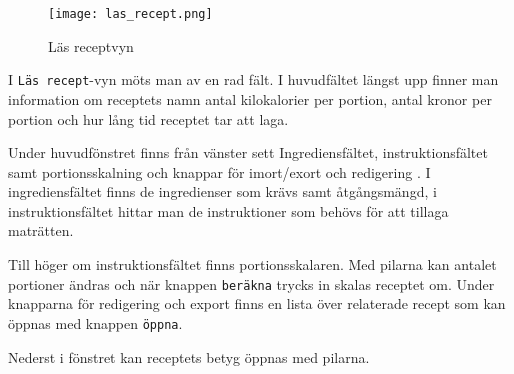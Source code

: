 \begin{figure}[H]
        \centering 
        \texttt{[image: las\_recept.png]} 
        \caption{Läs receptvyn} 
        \label{fig:receptvyn}
\end{figure}

I \verb+Läs recept+-vyn möts man av en rad fält. I huvudfältet längst upp finner
man information om receptets namn antal kilokalorier per portion,
antal kronor per portion och hur lång tid receptet tar att laga.

Under huvudfönstret finns från vänster sett Ingrediensfältet,
instruktionsfältet samt portionsskalning och knappar för imort/exort
och redigering . I ingrediensfältet finns de ingredienser som krävs
samt åtgångsmängd, i instruktionsfältet hittar man de instruktioner
som behövs för att tillaga maträtten.

Till höger om instruktionsfältet finns portionsskalaren. Med pilarna
kan antalet portioner ändras och när knappen \verb+beräkna+ trycks in
skalas receptet om. Under knapparna för redigering och export finns en
lista över relaterade recept som kan öppnas med knappen \verb+öppna+.

Nederst i fönstret kan receptets betyg öppnas med pilarna.
